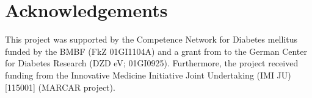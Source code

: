 \documentclass[final,5p,times,twocolumn]{elsarticle}
\begin{document}
\section{Acknowledgements}
This project was supported by the Competence Network for Diabetes mellitus funded by the BMBF (FkZ 01GI1104A) and a grant from to the German Center for Diabetes Research (DZD eV; 01GI0925). Furthermore, the project received funding from the Innovative Medicine Initiative Joint Undertaking (IMI JU) [115001] (MARCAR project).














\end{document}
